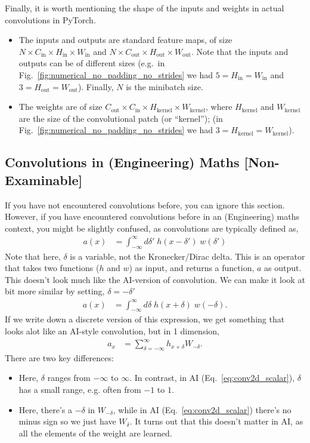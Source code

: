 \documentclass{article}
\newcommand{\Cin}{C_\text{in}}
\newcommand{\Cout}{C_\text{out}}
\newcommand{\Win}{W_\text{in}}
\newcommand{\Wout}{W_\text{out}}
\newcommand{\Wk}{W_\text{kernel}}
\newcommand{\Hin}{H_\text{in}}
\newcommand{\Hout}{H_\text{out}}
\newcommand{\Hk}{H_\text{kernel}}
\begin{document}
Finally, it is worth mentioning the shape of the inputs and weights in actual convolutions in PyTorch.
\begin{itemize}
  \item The inputs and outputs are standard feature maps, of size $N \times \Cin \times \Hin \times \Win$ and $N \times \Cout \times \Hout \times \Wout$. Note that the inputs and outputs can be of different sizes (e.g.\ in Fig.~\ref{fig:numerical_no_padding_no_strides} we had $5 = \Hin = \Win$ and $3 = \Hout = \Wout$). Finally, $N$ is the minibatch size.
  \item The weights are of size $\Cout \times \Cin \times \Hk \times \Wk$, where $\Hk$ and $\Wk$ are the size of the convolutional patch (or ``kernel''); (in Fig.~\ref{fig:numerical_no_padding_no_strides} we had $3 = \Hk = \Wk$).
\end{itemize}

\subsection{Convolutions in (Engineering) Maths [Non-Examinable]}

If you have not encountered convolutions before, you can ignore this section.
However, if you have encountered convolutions before in an (Engineering) maths context, you might be slightly confused, as convolutions are typically defined as,
\begin{align}
  \label{eq:math_conv}
  a(x) &= \int_{-\infty}^\infty d\delta' \; h(x - \delta') \; w(\delta') 
\end{align}
Note that here, $\delta$ is a variable, not the Kronecker/Dirac delta.
This is an operator that takes two functions ($h$ and $w$) as input, and returns a function, $a$ as output.
This doesn't look much like the AI-version of convolution.
We can make it look at bit more similar by setting, $\delta = -\delta'$
\begin{align}
  a(x) &= \int_{-\infty}^\infty d\delta \; h(x + \delta) \; w(-\delta).
\end{align}
If we write down a discrete version of this expression, we get something that looks alot like an AI-style convolution, but in 1 dimension,
\begin{align}
  a_{x} &= \sum_{\delta=-\infty}^\infty h_{x+\delta} W_{-\delta}.
\end{align}
There are two key differences:
\begin{itemize}
  \item Here, $\delta$ ranges from $-\infty$ to $\infty$.  In contrast, in AI (Eq.~\ref{eq:conv2d_scalar}), $\delta$ has a small range, e.g. often from $-1$ to $1$.
  \item Here, there's a $-\delta$ in $W_{-\delta}$, while in AI (Eq.~\ref{eq:conv2d_scalar}) there's no minus sign so we just have $W_\delta$.  It turns out that this doesn't matter in AI, as all the elements of the weight are learned.
\end{itemize}
\end{document}
